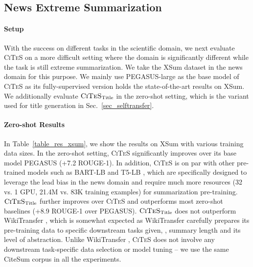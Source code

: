 \documentclass[11pt]{article}
\newcommand{\ours}{\textsc{CiTeS}\xspace}
\newcommand{\oursTitle}{$\textsc{CiTeS}_{\text{Title}}$\xspace}
\newcommand{\ourdata}{CiteSum\xspace}
\begin{document}
\subsection{News Extreme Summarization}
\label{sec_transfer_xsum}
\paragraph{Setup}
With the success on different tasks in the scientific domain, we next evaluate \ours on a more difficult setting where the domain is significantly different while the task is still extreme summarization.
We take the XSum dataset \cite{narayan-etal-2018-dont} in the news domain for this purpose.
We mainly use PEGASUS-large \cite{zhang2020pegasus} as the base model of \ours as its fully-supervised version holds the state-of-the-art results on XSum.
We additionally evaluate \oursTitle in the zero-shot setting, which is the variant used for title generation in Sec.~\ref{sec_selftransfer}.




\paragraph{Zero-shot Results}
In Table~\ref{table_res_xsum}, we show the results on XSum with various training data sizes.
In the zero-shot setting, \ours significantly improves over its base model PEGASUS (+7.2 ROUGE-1).
In addition, \ours is on par with other pre-trained models such as BART-LB and T5-LB \cite{zhu2021leveraging}, which are specifically designed to leverage the lead bias in the news domain and require much more resources (32 vs. 1 GPU, 21.4M vs. 83K training examples) for summarization pre-training.
\oursTitle further improves over \ours and outperforms most zero-shot baselines (+8.9 ROUGE-1 over PEGASUS).
\oursTitle does not outperform WikiTransfer \cite{fabbri-etal-2021-improving}, which is somewhat expected as WikiTransfer carefully prepares its pre-training data to specific downstream tasks given, \eg, summary length and its level of abstraction.
Unlike WikiTransfer \cite{fabbri-etal-2021-improving}, \ours does not involve any downstream task-specific data selection or model tuning -- we use the same \ourdata corpus in all the experiments.
\end{document}
